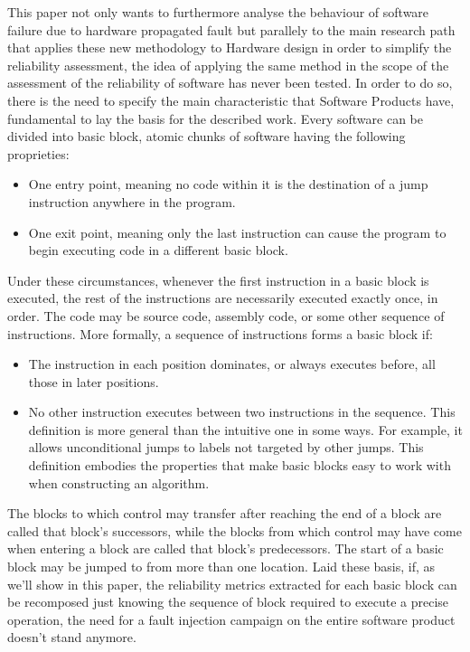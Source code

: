 \documentclass[./dissertation.tex]{subfiles}
\begin{document}
This paper not only wants to furthermore analyse the behaviour of software failure due to hardware propagated fault but parallely  to the main research \cite{9486705} path that applies these new methodology to Hardware design in order to simplify the reliability assessment, the idea of applying the same method in the scope of the assessment of the reliability of software has never been tested. In order to do so, there is the need to specify the main characteristic that Software Products have, fundamental to lay the basis for the described work. Every software can be divided into basic block, atomic chunks of software having the following proprieties:
\begin{itemize}
    \item One entry point, meaning no code within it is the destination of a jump instruction anywhere in the program.
    \item One exit point, meaning only the last instruction can cause the program to begin executing code in a different
basic block.
\end{itemize}
Under these circumstances, whenever the first instruction in a basic block is executed, the rest of the instructions are
necessarily executed exactly once, in order.
The code may be source code, assembly code, or some other sequence of instructions.
More formally, a sequence of instructions forms a basic block if:
\begin{itemize}
    \item The instruction in each position dominates, or always executes before, all those in later positions.
    \item No other instruction executes between two instructions in the sequence.
This definition is more general than the intuitive one in some ways. For example, it allows unconditional jumps to
labels not targeted by other jumps. This definition embodies the properties that make basic blocks easy to work with
when constructing an algorithm.
\end{itemize}

The blocks to which control may transfer after reaching the end of a block are called that block’s successors, while the blocks from which control may have come when entering a block are called that block’s predecessors. The start of a basic block may be jumped to from more than one location.
Laid these basis, if, as we'll show in this paper, the reliability metrics extracted for each basic block can be recomposed just knowing the sequence of block required to execute a precise operation, the need for a fault injection campaign on the entire software product doesn't stand anymore.
\end{document}
